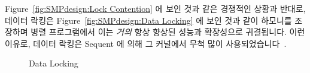 Figure~\ref{fig:SMPdesign:Lock Contention} 에 보인 것과 같은 경쟁적인 상황과
반대로, 데이터 락킹은
Figure~\ref{fig:SMPdesign:Data Locking} 에 보인 것과 같이 하모니를 조장하며
병렬 프로그램에서 이는 \emph{거의} 항상 향상된 성능과 확장성으로 귀결됩니다.
이런 이유로, 데이터 락킹은 Sequent 에 의해 그 커널에서 무척 많이
사용되었습니다~\cite{Beck85,Inman85,Garg90,Dove90,McKenney92b,McKenney92a,McKenney93}.

\begin{figure}[tbh]
\centering
{}
\caption{Data Locking}
\end{figure}

